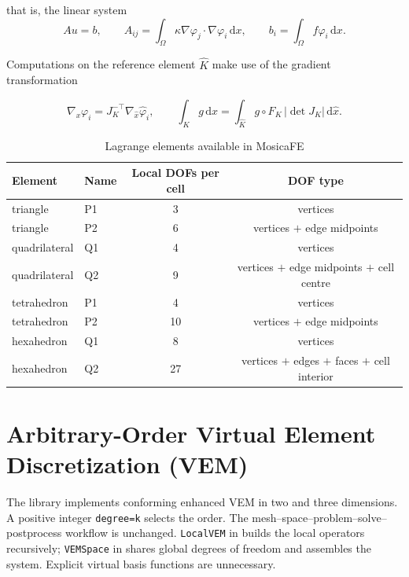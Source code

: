 \documentclass[11pt,oneside]{book}
\theoremstyle{definition}
\theoremstyle{plain}
\newcommand{\mosica}{\textsf{MosicaFE}}
\newcommand{\code}[1]{\texttt{#1}}
\newcommand{\dif}{\,\mathrm{d}}
\begin{document}
that is, the linear system
\begin{equation}
A u = b,\qquad
A_{ij}=\int_\Omega\kappa\nabla\varphi_j\cdot\nabla\varphi_i\dif x,\qquad
b_i=\int_\Omega f\varphi_i\dif x .
\label{eq:Au}
\end{equation}

Computations on the reference element $\hat K$ make use of the gradient
transformation

\begin{equation}
\nabla_x\varphi_i = J_K^{-\top}\nabla_{\hat x}\hat\varphi_i,
\qquad
\int_K g\dif x=\int_{\hat K}g\circ F_K\,|\det J_K|\dif\hat x .
\label{eq:transform}
\end{equation}

\begin{table}[htbp]
\centering
\caption{Lagrange elements available in \mosica{}}
\label{tab:lagrange}
\begin{lrbox}{\guideTableBox}
\begin{tabular}{@{}llcc@{}}
\toprule
Element & Name & Local DOFs per cell & DOF type \\
\midrule
triangle & P1 & 3 & vertices \\
triangle & P2 & 6 & vertices $+$ edge midpoints \\
quadrilateral & Q1 & 4 & vertices \\
quadrilateral & Q2 & 9 & vertices $+$ edge midpoints $+$ cell centre \\
tetrahedron & P1 & 4 & vertices \\
tetrahedron & P2 & 10 & vertices $+$ edge midpoints \\
hexahedron & Q1 & 8 & vertices \\
hexahedron & Q2 & 27 & vertices $+$ edges $+$ faces $+$ cell interior \\
\bottomrule
\end{tabular}
\end{lrbox}%
\ifdim\wd\guideTableBox>\linewidth
  \resizebox{\linewidth}{!}{\usebox{\guideTableBox}}%
\else\usebox{\guideTableBox}\fi
\end{table}

\section[Arbitrary-Order VEM]{Arbitrary-Order Virtual Element Discretization (VEM)}
\label{sec:vem-math}
The library implements conforming enhanced VEM in two and three dimensions.
A positive integer \code{degree=k} selects the order. The mesh--space--problem--solve--postprocess
workflow is unchanged. \code{LocalVEM} in  builds the local
operators recursively; \code{VEMSpace} in  shares global degrees
of freedom and assembles the system. Explicit virtual basis functions are unnecessary.
\end{document}
